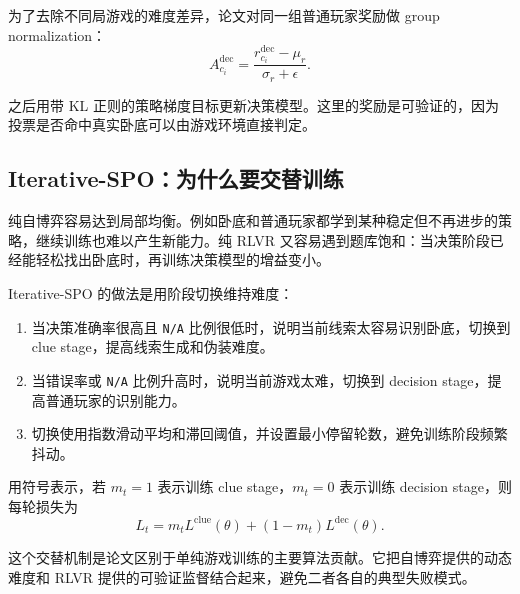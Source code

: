 为了去除不同局游戏的难度差异，论文对同一组普通玩家奖励做 group normalization：
\begin{equation}
    A_{c_i}^{\text{dec}} =
    \frac{r_{c_i}^{\text{dec}}-\mu_r}{\sigma_r+\epsilon}.
\end{equation}

之后用带 KL 正则的策略梯度目标更新决策模型。这里的奖励是可验证的，因为投票是否命中真实卧底可以由游戏环境直接判定。

\subsection{Iterative-SPO：为什么要交替训练}

纯自博弈容易达到局部均衡。例如卧底和普通玩家都学到某种稳定但不再进步的策略，继续训练也难以产生新能力。纯 RLVR 又容易遇到题库饱和：当决策阶段已经能轻松找出卧底时，再训练决策模型的增益变小。

Iterative-SPO 的做法是用阶段切换维持难度：

\begin{enumerate}
    \item 当决策准确率很高且 \texttt{N/A} 比例很低时，说明当前线索太容易识别卧底，切换到 clue stage，提高线索生成和伪装难度。
    \item 当错误率或 \texttt{N/A} 比例升高时，说明当前游戏太难，切换到 decision stage，提高普通玩家的识别能力。
    \item 切换使用指数滑动平均和滞回阈值，并设置最小停留轮数，避免训练阶段频繁抖动。
\end{enumerate}

用符号表示，若 $m_t=1$ 表示训练 clue stage，$m_t=0$ 表示训练 decision stage，则每轮损失为
\begin{equation}
    L_t = m_t L^{\text{clue}}(\theta) + (1-m_t)L^{\text{dec}}(\theta).
\end{equation}

这个交替机制是论文区别于单纯游戏训练的主要算法贡献。它把自博弈提供的动态难度和 RLVR 提供的可验证监督结合起来，避免二者各自的典型失败模式。
